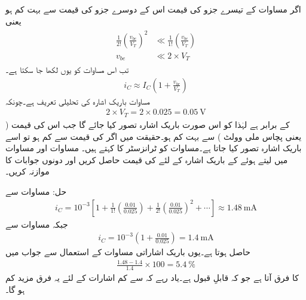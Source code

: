 اگر مساوات   کے تیسرے جزو کی قیمت اس کے دوسرے جزو کی قیمت سے بہت کم ہو یعنی
\begin{gather} \label{مساوات_ٹرانزسٹر_باریک_اشارہ_کی_تحلیلی_تعریف}
\begin{aligned}
\frac{1}{2!} \left(\frac{v_{be}}{V_T} \right )^2 & \ll \frac{1}{1!} \left(\frac{v_{be}}{V_T} \right )\\
v_{be}  & \ll 2 \times V_T
\end{aligned}
\end{gather}
تب اس مساوات کو یوں لکھا جا سکتا ہے۔
\begin{align} \label{مساوات_ٹرانزسٹر_کی_باریک_اشاراتی_مساوات}
i_C \approx I_C \left (1+\frac{v_{be}}{V_T} \right )
\end{align}
مساوات   باریک اشارہ  کی تحلیلی تعریف ہے۔چونکہ
\begin{align*}
2 \times V_T = 2 \times 0.025 =\SI{0.05}{\volt}
\end{align*}
کے برابر ہے لہٰذا  کو اس صورت باریک اشارہ تصور کیا جائے گا جب اس کی قیمت    ( یعنی پچاس ملی وولٹ ) سے بہت کم ہو۔حقیقت میں اگر   کی قیمت  سے کم ہو تو اسے باریک اشارہ تصور کیا جاتا ہے۔مساوات   کو ٹرانزسٹر کا  کہتے ہیں۔
مساوات   اور مساوات   میں   لیتے ہوئے  کے باریک اشارہ کے لئے  کی قیمت حاصل کریں اور دونوں جوابات کا موازنہ کریں۔

حل:	مساوات   سے
\begin{align*}
i_C=10^{-3} \left [1+\frac{1}{1!} \left(\frac{0.01}{0.025}\right)  +\frac{1}{2!} \left( \frac{0.01}{0.025} \right)^2   +\cdots \right ] \approx \SI{1.48}{\milli \ampere}
\end{align*}
جبکہ مساوات   سے
\begin{align*}
i_C=10^{-3} \left(1+\frac{0.01}{0.025} \right )=\SI{1.4}{\milli \ampere}
\end{align*}
حاصل ہوتا ہے۔یوں باریک اشاراتی مساوات کے استعمال سے جواب میں
\begin{align*}
\frac{1.48-1.4}{1.4} \times 100=\SI{5.4}{\percent}
\end{align*}
کا فرق آتا ہے جو کہ قابلِ قبول ہے۔یاد رہے کہ  سے کم اشارات کے لئے یہ فرق مزید کم ہو گا۔

